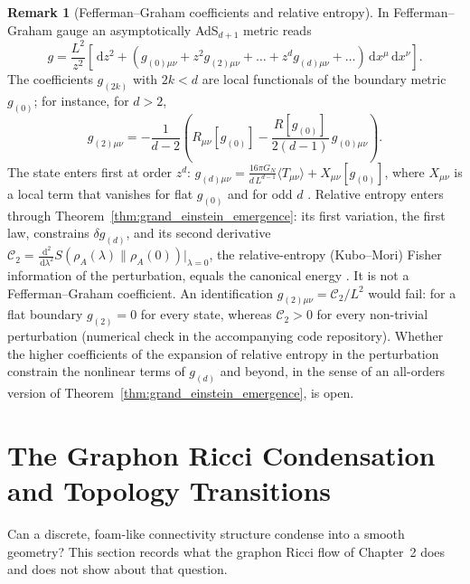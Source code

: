 \documentclass[11pt,a4paper,reqno]{amsart}
\theoremstyle{definition}
\newtheorem{remark}[theorem]{Remark}
\numberwithin{equation}{section}
\newcommand{\dif}{\,\mathrm{d}}
\begin{document}
\begin{remark}[Fefferman--Graham coefficients and relative entropy]
\label{rem:fefferman_graham}
In Fefferman--Graham gauge an asymptotically AdS$_{d+1}$ metric reads
\begin{equation}
    \label{eq:fefferman_graham_exact}
    g = \frac{L^2}{z^2}\left[ \dif z^2 + \left( g_{(0)\mu\nu} + z^2 g_{(2)\mu\nu} + \dots + z^d g_{(d)\mu\nu} + \dots \right) \dif x^\mu \dif x^\nu \right].
\end{equation}
The coefficients $g_{(2k)}$ with $2k < d$ are local functionals of the boundary metric $g_{(0)}$; for instance, for $d > 2$,
\[
g_{(2)\mu\nu} = -\frac{1}{d-2}\left( R_{\mu\nu}[g_{(0)}] - \frac{R[g_{(0)}]}{2(d-1)}\, g_{(0)\mu\nu} \right).
\]
The state enters first at order $z^d$: $g_{(d)\mu\nu} = \frac{16\pi G_N}{d\,L^{d-1}}\langle T_{\mu\nu}\rangle + X_{\mu\nu}[g_{(0)}]$, where $X_{\mu\nu}$ is a local term that vanishes for flat $g_{(0)}$ and for odd $d$ \cite{deharo2001holographic}. Relative entropy enters through Theorem~\ref{thm:grand_einstein_emergence}: its first variation, the first law, constrains $\delta g_{(d)}$, and its second derivative $\mathcal{C}_2 = \frac{\dif^2}{\dif\lambda^2} S(\rho_A(\lambda) \| \rho_A(0))|_{\lambda=0}$, the relative-entropy (Kubo--Mori) Fisher information of the perturbation, equals the canonical energy \cite{lashkari2016canonical}. It is not a Fefferman--Graham coefficient. An identification $g_{(2)\mu\nu} = \mathcal{C}_2/L^2$ would fail: for a flat boundary $g_{(2)} = 0$ for every state, whereas $\mathcal{C}_2 > 0$ for every non-trivial perturbation (numerical check in the accompanying code repository). Whether the higher coefficients of the expansion of relative entropy in the perturbation constrain the nonlinear terms of $g_{(d)}$ and beyond, in the sense of an all-orders version of Theorem~\ref{thm:grand_einstein_emergence}, is open.
\end{remark}

\section{The Graphon Ricci Condensation and Topology Transitions}
\label{sec:graphon_condensation}

Can a discrete, foam-like connectivity structure condense into a smooth geometry? This section records what the graphon Ricci flow of Chapter~2 does and does not show about that question.
\end{document}
